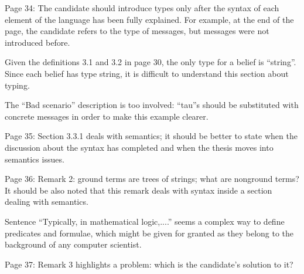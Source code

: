 \documentclass{article}
\newcommand{\todo}[1]{[\textcolor{red}{TODO}: #1]}
\newenvironment{them}{\noindent\begingroup\color{blue}}{\endgroup\par}
\begin{document}
\begin{them}

Page 34:
The candidate should introduce types only after the syntax of each element of
the language has been fully explained. For example, at the end of the page, the
candidate refers to the type of messages, but messages were not introduced
before.

\end{them}
\todo{}

\begin{them}

Given the definitions 3.1 and 3.2 in page 30, the only type for a belief is
“string”. Since each belief has type string, it is difficult to understand this
section about typing.

\end{them}
\todo{clarify}

\begin{them}

The “Bad scenario” description is too involved: “tau”s should be substituted
with concrete messages in order to make this example clearer.

\end{them}
\todo{}

\begin{them}

Page 35:
Section 3.3.1 deals with semantics; it should be better to state when the
discussion about the syntax has completed and when the thesis moves into
semantics issues.

\end{them}
\todo{?}

\begin{them}

Page 36:
Remark 2: ground terms are trees of strings; what are nonground terms? It
should be also noted that this remark deals with syntax inside a section
dealing with semantics.

\end{them}
\todo{?}

\begin{them}

Sentence “Typically, in mathematical logic,....” seems a complex way to define
predicates and formulae, which might be given for granted as they belong to the
background of any computer scientist.

\end{them}
\todo{?}

\begin{them}

Page 37:
Remark 3 highlights a problem: which is the candidate's solution to it?
\end{them}
\todo{?}
\end{document}
